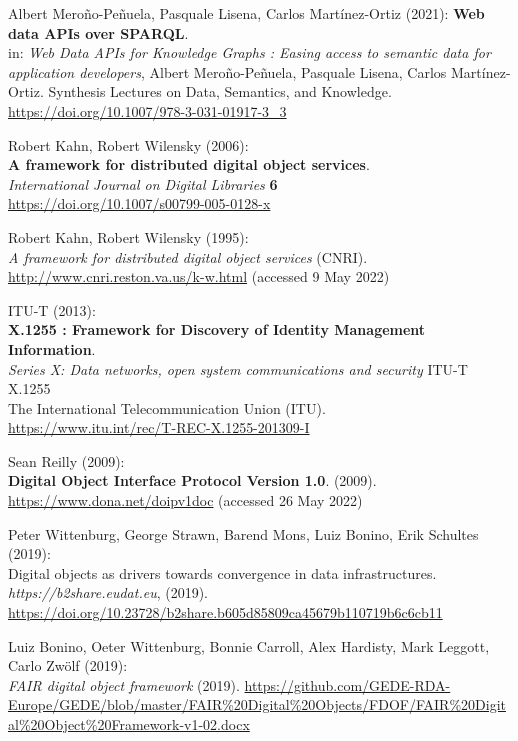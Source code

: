 \begin{thebibliography}{9}
Albert Meroño-Peñuela, Pasquale Lisena, Carlos Martínez-Ortiz (2021):
\textbf{Web data APIs over {SPARQL}}. \\
in: \emph{Web Data APIs for Knowledge Graphs : Easing access to semantic data for application developers}, 
Albert Meroño-Peñuela, Pasquale Lisena, Carlos Martínez-Ortiz.
Synthesis Lectures on Data, Semantics, and Knowledge.
\url{https://doi.org/10.1007/978-3-031-01917-3_3}

Robert Kahn, Robert Wilensky (2006): \\
\textbf{A framework for distributed digital object services}.\\
\emph{International Journal on Digital Libraries} \textbf{6} \\
\url{https://doi.org/10.1007/s00799-005-0128-x}

Robert Kahn, Robert Wilensky (1995): \\
\emph{A framework for distributed digital object services} (CNRI).
\url{http://www.cnri.reston.va.us/k-w.html} (accessed 9 May 2022)

ITU-T (2013): \\
\textbf{X.1255 : Framework for Discovery of Identity Management Information}.\\
\emph{Series X: Data networks, open system communications and security} ITU-T X.1255 \\
The International Telecommunication Union (ITU).\\
\url{https://www.itu.int/rec/T-REC-X.1255-201309-I}

Sean Reilly (2009): \\
\textbf{Digital Object Interface Protocol Version 1.0}.
(2009). \url{https://www.dona.net/doipv1doc} (accessed 26 May 2022)

Peter Wittenburg, George Strawn, Barend Mons, Luiz Bonino, Erik
Schultes (2019): \\
Digital objects as drivers towards convergence in data
infrastructures. \emph{https://b2share.eudat.eu}, (2019).
\url{https://doi.org/10.23728/b2share.b605d85809ca45679b110719b6c6cb11}

Luiz Bonino, Oeter Wittenburg, Bonnie Carroll, Alex Hardisty, Mark
Leggott, Carlo Zwölf (2019): \\
\emph{{FAIR} digital object framework}
(2019).
\url{https://github.com/GEDE-RDA-Europe/GEDE/blob/master/FAIR\%20Digital\%20Objects/FDOF/FAIR\%20Digital\%20Object\%20Framework-v1-02.docx}


\end{thebibliography}
